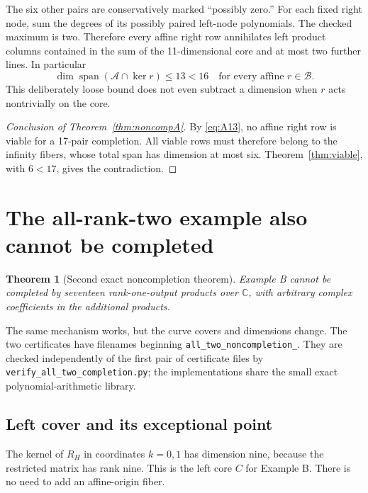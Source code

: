 \documentclass[11pt]{article}
\newtheorem{theorem}{Theorem}[section]
\theoremstyle{definition}\newtheorem{definition}[theorem]{Definition}
\newcommand{\C}{\mathbb C}\newcommand{\Q}{\mathbb Q}
\newcommand{\Span}{\operatorname{span}}
\newcommand{\file}[1]{\nolinkurl{#1}}
\begin{document}
The six other pairs are conservatively marked ``possibly zero.'' For each fixed right node, sum the degrees of its possibly paired left-node polynomials. The checked maximum is two. Therefore every affine right row annihilates left product columns contained in the sum of the 11-dimensional core and at most two further lines. In particular
\begin{equation}\label{eq:A13}
\dim\Span(\mathcal A\cap\ker r)\le13<16
\quad\text{for every affine }r\in\mathcal B.
\end{equation}
This deliberately loose bound does not even subtract a dimension when $r$ acts nontrivially on the core.

\begin{proof}[Conclusion of Theorem~\ref{thm:noncompA}]
By \eqref{eq:A13}, no affine right row is viable for a 17-pair completion. All viable rows must therefore belong to the infinity fibers, whose total span has dimension at most six. Theorem~\ref{thm:viable}, with $6<17$, gives the contradiction.
\end{proof}

\section{The all-rank-two example also cannot be completed}\label{sec:noncompB}
\begin{theorem}[Second exact noncompletion theorem]\label{thm:noncompB}
Example B cannot be completed by seventeen rank-one-output products over $\C$, with arbitrary complex coefficients in the additional products.
\end{theorem}
The same mechanism works, but the curve covers and dimensions change. The two certificates have filenames beginning \file{all_two_noncompletion_}. They are checked independently of the first pair of certificate files by \file{verify_all_two_completion.py}; the implementations share the small exact polynomial-arithmetic library.

\subsection{Left cover and its exceptional point}
The kernel of $R_H$ in coordinates $k=0,1$ has dimension nine, because the restricted matrix has rank nine. This is the left core $C$ for Example B. There is no need to add an affine-origin fiber.
\end{document}
